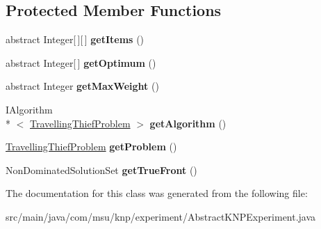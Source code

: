 \subsection*{Protected Member Functions}
\begin{DoxyCompactItemize}
\item 
\hypertarget{classcom_1_1msu_1_1knp_1_1experiment_1_1AbstractKNPExperiment_ab8c8ffebc97f2bfc8678c6b1ed6eb6d6}{abstract Integer\mbox{[}$\,$\mbox{]}\mbox{[}$\,$\mbox{]} {\bfseries get\-Items} ()}\label{classcom_1_1msu_1_1knp_1_1experiment_1_1AbstractKNPExperiment_ab8c8ffebc97f2bfc8678c6b1ed6eb6d6}

\item 
\hypertarget{classcom_1_1msu_1_1knp_1_1experiment_1_1AbstractKNPExperiment_accbb89d4b4f45734e2f3540fc76cc656}{abstract Integer\mbox{[}$\,$\mbox{]} {\bfseries get\-Optimum} ()}\label{classcom_1_1msu_1_1knp_1_1experiment_1_1AbstractKNPExperiment_accbb89d4b4f45734e2f3540fc76cc656}

\item 
\hypertarget{classcom_1_1msu_1_1knp_1_1experiment_1_1AbstractKNPExperiment_a208d2eaaab58f4d6f6bd397a0819d8c0}{abstract Integer {\bfseries get\-Max\-Weight} ()}\label{classcom_1_1msu_1_1knp_1_1experiment_1_1AbstractKNPExperiment_a208d2eaaab58f4d6f6bd397a0819d8c0}

\item 
\hypertarget{classcom_1_1msu_1_1knp_1_1experiment_1_1AbstractKNPExperiment_af311b9ed85d2fc1a7b01fb7a91157dca}{I\-Algorithm\\*
$<$ \hyperlink{classcom_1_1msu_1_1thief_1_1problems_1_1TravellingThiefProblem}{Travelling\-Thief\-Problem} $>$ {\bfseries get\-Algorithm} ()}\label{classcom_1_1msu_1_1knp_1_1experiment_1_1AbstractKNPExperiment_af311b9ed85d2fc1a7b01fb7a91157dca}

\item 
\hypertarget{classcom_1_1msu_1_1knp_1_1experiment_1_1AbstractKNPExperiment_a5a8de059fb862c9299f56d01259bdcfe}{\hyperlink{classcom_1_1msu_1_1thief_1_1problems_1_1TravellingThiefProblem}{Travelling\-Thief\-Problem} {\bfseries get\-Problem} ()}\label{classcom_1_1msu_1_1knp_1_1experiment_1_1AbstractKNPExperiment_a5a8de059fb862c9299f56d01259bdcfe}

\item 
\hypertarget{classcom_1_1msu_1_1knp_1_1experiment_1_1AbstractKNPExperiment_a3bfc662e5dad83990fc88a6ab526ce85}{Non\-Dominated\-Solution\-Set {\bfseries get\-True\-Front} ()}\label{classcom_1_1msu_1_1knp_1_1experiment_1_1AbstractKNPExperiment_a3bfc662e5dad83990fc88a6ab526ce85}

\end{DoxyCompactItemize}


The documentation for this class was generated from the following file\-:\begin{DoxyCompactItemize}
\item 
src/main/java/com/msu/knp/experiment/Abstract\-K\-N\-P\-Experiment.\-java\end{DoxyCompactItemize}
